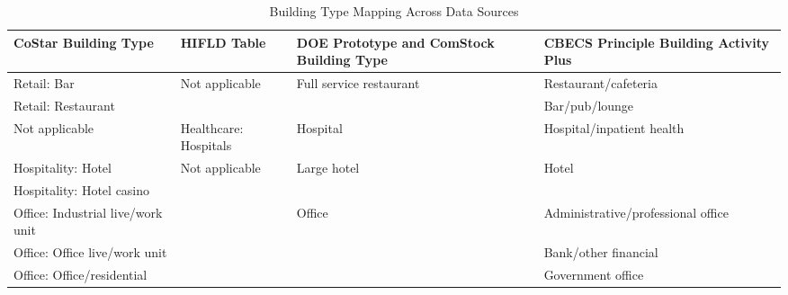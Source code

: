 \begin{table}
\centering
\small
\caption[Building Type Mapping Across Data Sources]{Building Type Mapping Across Data Sources}
\label{tab:building_types}
\begin{tabular}{|p{4.25cm}|p{3.5cm}|p{3.25cm}|p{4.25cm}|}
\hline
\textbf{CoStar Building   Type}                                & \multicolumn{1}{l|}{\textbf{HIFLD Table}}                & \textbf{DOE Prototype and ComStock Building Type}                               & \textbf{CBECS Principle Building Activity Plus }         \\ \hline
Retail:   Bar                                         & \multirow{2}{*}{Not applicable}                 & \multirow{2}{*}{Full service restaurant}  & Restaurant/cafeteria                            \\ \cline{1-1} \cline{4-4}
Retail: Restaurant                                    &                                                 &                                           & Bar/pub/lounge                                  \\ \hline
\multicolumn{1}{|l|}{Not applicable}                  & \multicolumn{1}{l|}{Healthcare: Hospitals}      & Hospital                                  & Hospital/inpatient health                       \\ \hline
Hospitality: Hotel                                    & \multirow{12}{*}{Not applicable}                & \multirow{2}{*}{Large hotel}              & \multirow{2}{*}{Hotel}                          \\ \cline{1-1}
Hospitality: Hotel casino                             &                                                 &                                           &                                                 \\ \cline{1-1} \cline{3-4}
Office: Industrial live/work   unit                   &                                                 & \multirow{6}{*}{Office}                   & Administrative/professional office              \\ \cline{1-1} \cline{4-4}
Office: Office live/work unit                         &                                                 &                                           & Bank/other financial                            \\ \cline{1-1} \cline{4-4}
Office: Office/residential                            &                                                 &                                           & Government office                               \\ \cline{1-1} \cline{4-4}

\end{tabular}
\end{table}
